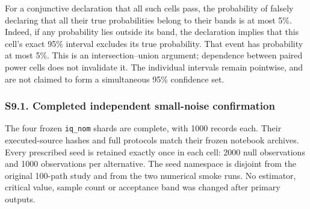 \documentclass[
  american,
  11pt,
]{article}
\begin{document}
For a conjunctive declaration that all such cells pass, the probability
of falsely declaring that all their true probabilities belong to their
bands is at most 5\%. Indeed, if any probability lies outside its band,
the declaration implies that this cell's exact 95\% interval excludes
its true probability. That event has probability at most 5\%. This is an
intersection--union argument; dependence between paired power cells does
not invalidate it. The individual intervals remain pointwise, and are
not claimed to form a simultaneous 95\% confidence set.

\subsubsection{S9.1. Completed independent small-noise
confirmation}\label{s9.1.-completed-independent-small-noise-confirmation}

The four frozen \texttt{iq\_nom} shards are complete, with 1000 records
each. Their executed-source hashes and full protocols match their frozen
notebook archives. Every prescribed seed is retained exactly once in
each cell: 2000 null observations and 1000 observations per alternative.
The seed namespace is disjoint from the original 100-path study and from
the two numerical smoke runs. No estimator, critical value, sample count
or acceptance band was changed after primary outputs.
\end{document}
